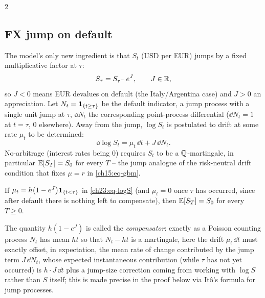 \begin{paracol}{2}
\subsection{FX jump on default}\label{ch23:sec-fxjump}
The model's only new ingredient is that $S_t$ (USD per EUR) jumps by a fixed multiplicative factor at $\tau$:
\begin{equation}\label{ch23:eq-jumpdef}
  S_{\tau}=S_{\tau^-}\,e^{J},\qquad J\in\mathbb{R},
\end{equation}
so $J<0$ means EUR devalues on default (the Italy/Argentina case) and $J>0$ an appreciation. Let $N_t=\mathbf{1}_{\{t\ge
\tau\}}$ be the default indicator, a jump process with a single unit jump at $\tau$, $\dd N_t$ the corresponding
point-process differential ($\dd N_t=1$ at $t=\tau$, $0$ elsewhere). Away from the jump, $\log S_t$ is postulated
to drift at some rate $\mu_t$ to be determined:
\begin{equation}\label{ch23:eq-logS}
  \dd\log S_t=\mu_t\,\dd t+J\,\dd N_t .
\end{equation}
No-arbitrage (interest rates being $0$) requires $S_t$ to be a $\mathbb{Q}$-martingale, in particular $\mathbb{E}[S_T]=S_0$ for
every $T$ -- the jump analogue of the risk-neutral drift condition that fixes $\mu=r$ in \cref{ch15:eq-gbm}.

\begin{proposition}\label{ch23:prop-compensator}
If $\mu_t=h\bigl(1-e^{J}\bigr)\mathbf{1}_{\{t<\tau\}}$ in \cref{ch23:eq-logS} (and $\mu_t=0$ once $\tau$ has occurred,
since after default there is nothing left to compensate), then $\mathbb{E}[S_T]=S_0$ for every $T\ge0$.
\end{proposition}
The quantity $h(1-e^J)$ is called the \emph{compensator}: exactly as a Poisson counting process $N_t$ has mean
$ht$ so that $N_t-ht$ is a martingale, here the drift $\mu_t\,\dd t$ must exactly offset, in expectation, the
mean rate of change contributed by the jump term $J\,\dd N_t$, whose expected instantaneous contribution (while
$\tau$ has not yet occurred) is $h\cdot J\,\dd t$ plus a jump-size correction coming from working with $\log S$
rather than $S$ itself; this is made precise in the proof below via It\^o's formula for jump processes.


\end{paracol}
